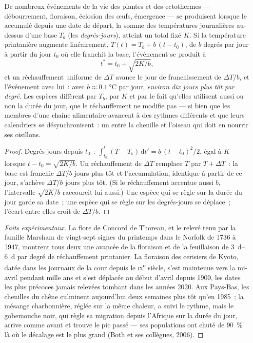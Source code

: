 \begin{theorem}\label{thm:b2:global-change:phenology}
De nombreux événements de la vie des plantes et des ectothermes ---
débourrement, floraison, éclosion des œufs, émergence --- se produisent
lorsque le \emph{} accumulé depuis une date de départ, la
somme des températures journalières au-dessus d'une base $T_b$ (les
\emph{degrés-jours}), atteint un total fixé $K$. Si la température
printanière augmente linéairement, $T(t) = T_b
+ b\,(t - t_0)$, de $b$ degrés par jour à partir du jour $t_0$ où elle
franchit la base, l'événement se produit à
\[
t^{*} = t_0 + \sqrt{2K/b},
\]
et un réchauffement uniforme de $\Delta T$ avance le jour de
franchissement de $\Delta T/b$, et l'événement avec lui~: avec $b \approx
\qty{0.1}{\celsius}$ par jour, \emph{environ dix jours plus tôt par
degré}. Les espèces diffèrent par $T_b$, par $K$ et par le fait qu'elles
utilisent aussi ou non la durée du jour, que le réchauffement ne modifie
pas --- si bien que les membres d'une chaîne alimentaire avancent à des
rythmes différents et que leurs calendriers se désynchronisent~: un
\emph{} entre la chenille et l'oiseau qui doit en
nourrir ses oisillons.
\end{theorem}
\begin{proof}
Degrés-jours depuis $t_0$~: $\int_{t_0}^{t}(T - T_b)\,\mathrm{d}t' =
b\,(t - t_0)^{2}/2$, égal à $K$ lorsque $t - t_0 = \sqrt{2K/b}$.
Un réchauffement de $\Delta T$ remplace $T$ par $T + \Delta T$~: la base
est franchie $\Delta T/b$ jours plus tôt et l'accumulation, identique à
partir de ce jour, s'achève $\Delta T/b$ jours plus tôt. (Si le
réchauffement accentue aussi $b$, l'intervalle $\sqrt{2K/b}$ raccourcit
lui aussi.) Une espèce qui se règle sur la durée du jour garde sa date~;
une espèce qui se règle sur les degrés-jours se déplace~; l'écart entre
elles croît de $\Delta T/b$.
\end{proof}
\begin{proof}[Faits expérimentaux]
La flore de Concord de Thoreau, et le relevé tenu par la famille Marsham
de vingt-sept signes du printemps dans le Norfolk de 1736 à 1947, montrent
tous deux une avancée de la floraison et de la feuillaison de
\qtyrange{3}{6}{d} par degré de réchauffement printanier. La floraison
des cerisiers de Kyoto, datée dans les journaux de la cour depuis le
\textsc{ix}\textsuperscript{e} siècle, s'est maintenue vers la mi-avril
pendant mille ans et s'est déplacée au début d'avril depuis 1900, les
dates les plus précoces jamais relevées tombant dans les années 2020. Aux
Pays-Bas, les chenilles du chêne culminent aujourd'hui deux semaines plus
tôt qu'en 1985~; la mésange charbonnière, réglée sur la même chaleur, a
suivi le rythme, mais le gobemouche noir, qui règle sa migration depuis
l'Afrique sur la durée du jour, arrive comme avant et trouve le pic
passé --- ses populations ont chuté de \qty{90}{\%} là où le décalage
est le plus grand (Both et ses collègues, 2006).
\end{proof}

